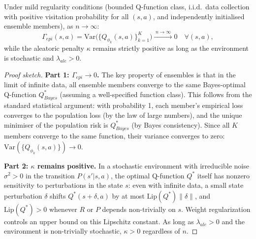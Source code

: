 \begin{proposition}
    \label{prop:epi_limit}
    Under mild regularity conditions (bounded Q-function class, i.i.d.\ data
    collection with positive visitation probability for all $(s,a)$, and
    independently initialised ensemble members), as $n\to\infty$:
    \begin{equation}
        \Gamma_{epi}(s,a) = \mathrm{Var}\bigl(\{Q_{\phi_k}(s,a)\}_{k=1}^K\bigr)
        \xrightarrow{\;n\to\infty\;} 0 \quad \forall (s,a),
    \end{equation}
    while the aleatoric penalty $\kappa$ remains strictly positive as long as
    the environment is stochastic and $\lambda_{ale}>0$.
\end{proposition}
\begin{proof}[Proof sketch]
    \textbf{Part 1: $\Gamma_{epi}\to 0$.}
    The key property of ensembles is that in the limit of infinite data, all
    ensemble members converge to the same Bayes-optimal Q-function
    $Q^*_{Bayes}$ (assuming a well-specified function class).  This follows
    from the standard statistical argument: with probability 1, each member's
    empirical loss converges to the population loss (by the law of large
    numbers), and the unique minimiser of the population risk is $Q^*_{Bayes}$
    (by Bayes consistency).  Since all $K$ members converge to the same
    function, their variance converges to zero:
    $\mathrm{Var}(\{Q_{\phi_k}(s,a)\})\to 0$.

    \textbf{Part 2: $\kappa$ remains positive.}
    In a stochastic environment with irreducible noise $\sigma^2>0$ in the
    transition $P(s'|s,a)$, the optimal Q-function $Q^*$ itself has nonzero
    sensitivity to perturbations in the state $s$: even with infinite data, a
    small state perturbation $\delta$ shifts $Q^*(s+\delta,a)$ by at most
    $\mathrm{Lip}(Q^*)\|\delta\|$, and $\mathrm{Lip}(Q^*)>0$ whenever $R$ or
    $P$ depends non-trivially on $s$.  Weight regularization controls an
    upper bound on this Lipschitz constant.  As long as $\lambda_{ale}>0$ and
    the environment is non-trivially stochastic, $\kappa>0$ regardless of $n$.
\end{proof}

